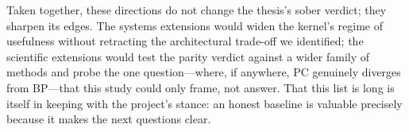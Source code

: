 \medskip

Taken together, these directions do not change the thesis's sober verdict; they
sharpen its edges. The systems extensions would widen the kernel's regime of
usefulness without retracting the architectural trade-off we identified; the
scientific extensions would test the parity verdict against a wider family of methods
and probe the one question---where, if anywhere, PC genuinely diverges from BP---that
this study could only frame, not answer. That this list is long is itself in keeping
with the project's stance: an honest baseline is valuable precisely because it makes
the next questions clear.
